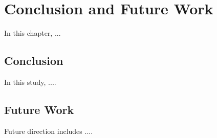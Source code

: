 

\chapter{Conclusion and Future Work}

In this chapter, ... 

\section{Conclusion}

In this study, ....

\section{Future Work}

Future direction includes ....
